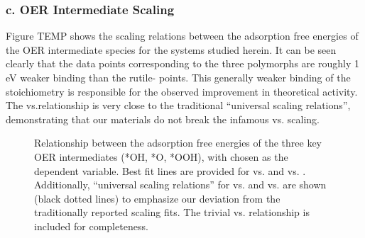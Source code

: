 

\subsubsection{c. OER Intermediate Scaling}

Figure TEMP shows the scaling relations between the adsorption free energies of the OER intermediate species for the \IrOx systems studied herein.
%
It can be seen clearly that the data points corresponding to the three  polymorphs are roughly 1 eV weaker binding than the rutile- points.
%
This generally weaker binding of the  stoichiometry is responsible for the observed improvement in theoretical activity.
%
The \DGOOH vs.\DGOH relationship is very close to the traditional ``universal scaling relations'', demonstrating that our materials do not break the infamous \DGOOH vs. \DGOH scaling.


\begin{figure}
\centering
{}
\caption{\label{fig:scaling_relations}
Relationship between the adsorption free energies of the three key OER intermediates (*OH, *O, *OOH), with \DGOH chosen as the dependent variable.
%
Best fit lines are provided for \DGOOH vs. \DGOH and \DGO vs. \DGOH.
%
Additionally, ``universal scaling relations'' for \DGOOH vs. \DGOH and \DGO vs. \DGOH are shown (black dotted lines) to emphasize our deviation from the traditionally reported scaling fits.
%
The trivial \DGOH vs. \DGOH relationship is included for completeness.
}
\end{figure}

